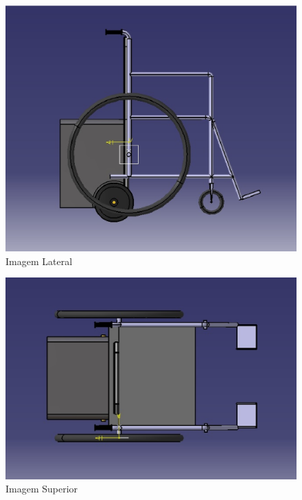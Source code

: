 \begin{figure}[!htb]
\centering
\includegraphics[keepaspectratio=true,scale=0.4]{figuras/estrutura/vista_lateral_cadeira}
\caption{Imagem Lateral}
\label{fig:lateral}
\end{figure}

\begin{figure}[!htb]
\centering
\includegraphics[keepaspectratio=true,scale=0.4]{figuras/estrutura/vista_superior}
\caption{Imagem Superior}
\label{fig:superior}
\end{figure}

